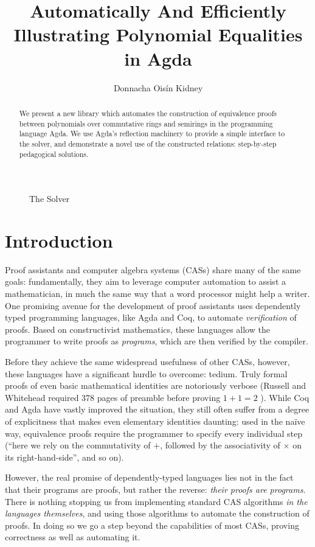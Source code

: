 \documentclass[draft, twocolumn]{article}
\author{Donnacha Oisín Kidney}
\title{Automatically And Efficiently Illustrating Polynomial Equalities in Agda}
\theoremstyle{definition}
\theoremstyle{definition}
\begin{document}
\maketitle
\begin{figure}
  \caption{The Solver}
  \label{the-solver}
\end{figure}
\begin{abstract}
  We present a new library which automates the construction of equivalence
  proofs between polynomials over commutative rings and semirings in the
  programming language Agda\cite{norell_dependently_2008}. We use Agda's
  reflection machinery to provide a simple interface to the solver, and
  demonstrate a novel use of the constructed relations: step-by-step pedagogical
  solutions.
\end{abstract}
\tableofcontents
\section{Introduction} 
Proof assistants and computer algebra systems (CASs) share many of the same
goals: fundamentally, they aim to leverage computer automation to assist a
mathematician, in much the same way that a word processor might help a writer.
One promising avenue for the development of proof assistants uses dependently
typed programming languages, like Agda\cite{norell_dependently_2008} and
Coq\cite{the_coq_development_team_2018_1219885}, to automate \emph{verification}
of proofs. Based on constructivist mathematics, these languages allow the
programmer to write proofs as \emph{programs}, which are then verified by the
compiler.

Before they achieve the same widespread usefulness of other CASs, however, these
languages have a significant hurdle to overcome: tedium. Truly formal proofs of
even basic mathematical identities are notoriously verbose (Russell and
Whitehead required 378 pages of preamble before proving \(1+1=2\)
\cite{whitehead_principia_1910}). While Coq and Agda have vastly improved the
situation, they still often suffer from a degree of explicitness that makes even
elementary identities daunting: used in the naïve way, equivalence proofs
require the programmer to specify every individual step (``here we rely on the
commutativity of \(+\), followed by the associativity of \(\times\) on its
right-hand-side'', and so on).

However, the real promise of dependently-typed languages lies not in the fact
that their programs are proofs, but rather the reverse: \emph{their proofs are
  programs}. There is nothing stopping us from implementing standard CAS
algorithms \emph{in the languages themselves}, and using those algorithms to
automate the construction of proofs. In doing so we go a step beyond the
capabilities of most CASs, proving correctness as well as automating it.
\end{document}
